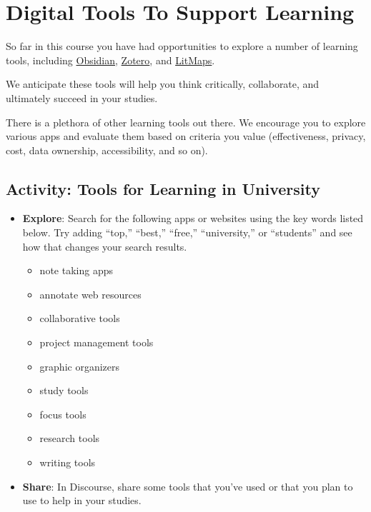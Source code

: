 \documentclass[
  letterpaper,
  DIV=11,
  numbers=noendperiod]{scrreprt}
\providecommand{\tightlist}{%
  \setlength{\itemsep}{0pt}\setlength{\parskip}{0pt}}\usepackage{longtable,booktabs,array}
\begin{document}
\section{Digital Tools To Support
Learning}\label{digital-tools-to-support-learning}

So far in this course you have had opportunities to explore a number of
learning tools, including \href{https://obsidian.md}{Obsidian},
\href{https://www.zotero.org/}{Zotero}, and
\href{https://www.litmaps.com/}{LitMaps}.

We anticipate these tools will help you think critically, collaborate,
and ultimately succeed in your studies.

There is a plethora of other learning tools out there. We encourage you
to explore various apps and evaluate them based on criteria you value
(effectiveness, privacy, cost, data ownership, accessibility, and so
on).

\subsection{Activity: Tools for Learning in
University}\label{activity-tools-for-learning-in-university}

\begin{tcolorbox}[enhanced jigsaw, toprule=.15mm, colback=white, colframe=quarto-callout-note-color-frame, bottomtitle=1mm, leftrule=.75mm, coltitle=black, titlerule=0mm, rightrule=.15mm, colbacktitle=quarto-callout-note-color!10!white, left=2mm, title={Learning Activity}, opacitybacktitle=0.6, opacityback=0, breakable, toptitle=1mm, arc=.35mm, bottomrule=.15mm]

\begin{itemize}
\tightlist
\item
  \textbf{Explore}: Search for the following apps or websites using the
  key words listed below. Try adding ``top,'' ``best,'' ``free,''
  ``university,'' or ``students'' and see how that changes your search
  results.

  \begin{itemize}
  \tightlist
  \item
    note taking apps
  \item
    annotate web resources
  \item
    collaborative tools
  \item
    project management tools
  \item
    graphic organizers
  \item
    study tools
  \item
    focus tools
  \item
    research tools
  \item
    writing tools
  \end{itemize}
\item
  \textbf{Share}: In Discourse, share some tools that you've used or
  that you plan to use to help in your studies.
\end{itemize}

\end{tcolorbox}
\end{document}
